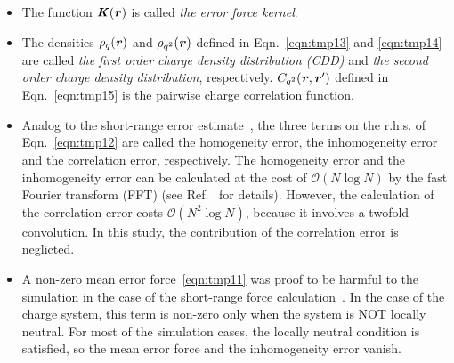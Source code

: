 \documentclass[aps,pre,preprint]{revtex4}
\renewcommand{\v}[1]{\textbf{\textit{#1}}}
\begin{document}
\begin{itemize}
\item The function $\v K(\v r)$ is called \emph{the error force
    kernel}.
\item The densities $\rho_q(\v r)$ and $\rho_{q^2}(\v r)$ defined in
  Eqn.~\eqref{eqn:tmp13} and \eqref{eqn:tmp14} are called \emph{the
    first order charge density distribution (CDD)} and \emph{the
    second order charge density distribution},
  respectively. $C_{q^2}(\v r, \v r')$ defined in
  Eqn.~\eqref{eqn:tmp15} is the pairwise charge correlation function.
\item Analog to the short-range error estimate~\cite{wang2012}, the
  three terms on the r.h.s. of Eqn.~\eqref{eqn:tmp12} are called the
  homogeneity error, the inhomogeneity error and the correlation
  error, respectively. The homogeneity error and the inhomogeneity
  error can be calculated at the cost of $\mathcal O(N\log N)$ by the
  fast Fourier transform (FFT) (see Ref.~\cite{wang2012} for details).
  However, the calculation of the correlation error costs $\mathcal
  O(N^2\log N)$, because it involves a twofold convolution. In this
  study, the contribution of the correlation error is neglicted.
\item A non-zero mean error force~\eqref{eqn:tmp11} was proof to be
  harmful to the simulation in the case of the short-range force
  calculation~\cite{wang2012}.  In the case of the charge system, this
  term is non-zero only when the system is NOT locally neutral. For
  most of the simulation cases, the locally neutral condition is
  satisfied, so the mean error force and the inhomogeneity error
  vanish.
\end{itemize}
\end{document}
